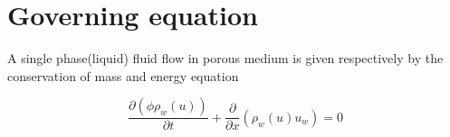 %
%



\section{Governing equation}
A single phase(liquid) fluid flow in porous medium is given respectively by the conservation of mass and energy equation \cite{Woods}

\begin{equation}\label{eq:cm}
\frac{\partial (\phi \rho_{w}(u))}{\partial t} +\frac{\partial }{\partial x}(\rho_{w}(u)u_{w})=0
\end{equation}

